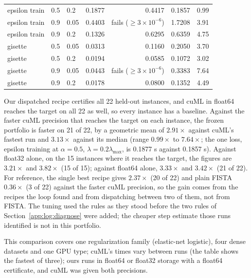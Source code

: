 \documentclass[11pt]{article}
\begin{document}
\begin{center}
\begin{tabular}{lllrrrr}
epsilon train & 0.5 & 0.2 & 0.1877 & 0.4417 & 0.1857 & 0.99 \\
epsilon train & 0.9 & 0.05 & 0.4403 & fails ($\ge3\times10^{-6}$) & 1.7208 & 3.91 \\
epsilon train & 0.9 & 0.2 & 0.1326 & 0.6295 & 0.6359 & 4.75 \\
gisette & 0.5 & 0.05 & 0.0313 & 0.1160 & 0.2050 & 3.70 \\
gisette & 0.5 & 0.2 & 0.0194 & 0.0585 & 0.1072 & 3.02 \\
gisette & 0.9 & 0.05 & 0.0443 & fails ($\ge3\times10^{-6}$) & 0.3383 & 7.64 \\
gisette & 0.9 & 0.2 & 0.0178 & 0.0800 & 0.1352 & 4.49 \\
\bottomrule
\end{tabular}
\end{center}

Our dispatched recipe certifies all 22 held-out instances, and cuML in float64
reaches the target on all 22 as well, so every instance has a baseline. Against
the faster cuML precision that reaches the target on each instance, the frozen
portfolio is faster on 21 of 22, by a geometric mean of $2.91\times$ against cuML's
fastest run and $3.13\times$ against its median (range $0.99\times$ to $7.64\times$;
the one loss, epsilon training at $\alpha=0.5$, $\lambda=0.2\lambda_{\max}$, is 0.1877 s
against 0.1857 s). Against float32 alone, on the 15 instances where it reaches the
target, the figures are $3.21\times$ and $3.82\times$ (15 of 15); against float64 alone,
$3.33\times$ and $3.42\times$ (21 of 22). For reference, the single best recipe gives
$2.37\times$ (20 of 22) and plain FISTA $0.36\times$ (3 of 22) against the faster cuML
precision, so the gain comes from the recipes the loop found and from dispatching
between two of them, not from FISTA. The tuning used the rules as they stood before
the two rules of Section~\ref{app:log:diagnose} were added; the cheaper step estimate
those runs identified is not in this portfolio.

This comparison covers one regularization family (elastic-net logistic), four dense datasets and
one GPU type; cuML's times vary between runs (the table shows the fastest of three);
ours runs in float64 or float32 storage with a float64
certificate, and cuML was given both precisions.
\end{document}
